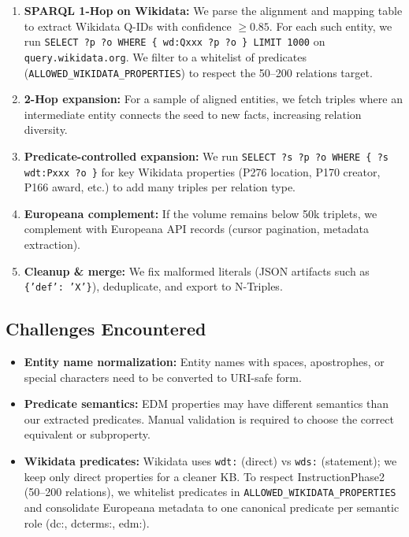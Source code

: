 \documentclass[11pt,a4paper]{article}
\begin{document}
  \begin{enumerate}
  \item \textbf{SPARQL 1-Hop on Wikidata:} We parse the alignment and mapping table to extract Wikidata Q-IDs with confidence $\geq 0.85$. For each such entity, we run \texttt{SELECT ?p ?o WHERE \{ wd:Qxxx ?p ?o \} LIMIT 1000} on \texttt{query.wikidata.org}. We filter to a whitelist of predicates (\texttt{ALLOWED\_WIKIDATA\_PROPERTIES}) to respect the 50--200 relations target.
  \item \textbf{2-Hop expansion:} For a sample of aligned entities, we fetch triples where an intermediate entity connects the seed to new facts, increasing relation diversity.
  \item \textbf{Predicate-controlled expansion:} We run \texttt{SELECT ?s ?p ?o WHERE \{ ?s wdt:Pxxx ?o \}} for key Wikidata properties (P276 location, P170 creator, P166 award, etc.) to add many triples per relation type.
  \item \textbf{Europeana complement:} If the volume remains below 50k triplets, we complement with Europeana API records (cursor pagination, metadata extraction).
  \item \textbf{Cleanup \& merge:} We fix malformed literals (JSON artifacts such as \texttt{\{'def': 'X'\}}), deduplicate, and export to N-Triples.
  \end{enumerate}

  \subsection{Challenges Encountered}

  \begin{itemize}
  \item \textbf{Entity name normalization:} Entity names with spaces, apostrophes, or special characters need to be converted to URI-safe form.

  \item \textbf{Predicate semantics:} EDM properties may have different semantics than our extracted predicates. Manual validation is required to choose the correct equivalent or subproperty.

  \item \textbf{Wikidata predicates:} Wikidata uses \texttt{wdt:} (direct) vs \texttt{wds:} (statement); we keep only direct properties for a cleaner KB. To respect InstructionPhase2 (50--200 relations), we whitelist predicates in \texttt{ALLOWED\_WIKIDATA\_PROPERTIES} and consolidate Europeana metadata to one canonical predicate per semantic role (dc:, dcterms:, edm:).
  \end{itemize}
\end{document}

